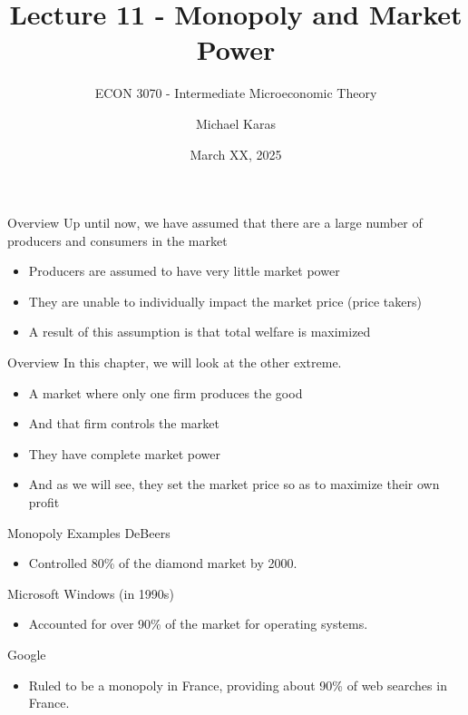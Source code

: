 \documentclass[11pt,t]{beamer}
\author{Michael Karas}
\title{Lecture 11 - Monopoly and Market Power}
\subtitle{ECON 3070 - Intermediate Microeconomic Theory}
\date{March XX, 2025}
\begin{document}
\begin{frame}
  \titlepage
\end{frame}

\begin{frame}{Overview}
  Up until now, we have assumed that there are a large number of producers and consumers in the market

  \begin{itemize}
    \item Producers are assumed to have very little market power
    
    \item They are unable to individually impact the market price (price takers)
     
    \item A result of this assumption is that total welfare is maximized
  \end{itemize}
\end{frame}

\begin{frame}{Overview}
  In this chapter, we will look at the other extreme.

  \begin{itemize}
    \item A market where only one firm produces the good
    \item And that firm controls the market
    \item They have complete market power
    \item And as we will see, they set the market price so as to maximize their own profit
  \end{itemize}
\end{frame}

\begin{frame}{Monopoly Examples}
  DeBeers 
  \begin{itemize}
    \item Controlled 80\% of the diamond market by 2000.
  \end{itemize}

  \bigskip
  Microsoft Windows (in 1990s)
  \begin{itemize}
    \item Accounted for over 90\% of the market for operating systems.
  \end{itemize}

  \bigskip
  Google
  \begin{itemize}
    \item Ruled to be a monopoly in France, providing about 90\% of web searches in France.
  \end{itemize}
\end{frame}
\end{document}
